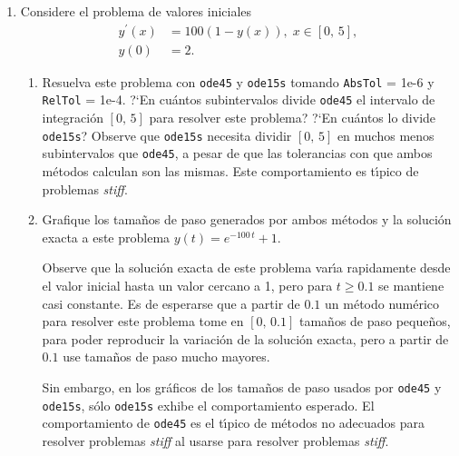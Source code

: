 \documentclass[letter,11pt]{article}
\begin{document}
\begin{enumerate}
\begin{enumerate}
\item Convierta \eqref{bubblepvi} a un sistema de ecuaciones diferenciales de primer
orden.
\item Resuelva el problema de valores iniciales resultante con $t \in [0,\,20]$
y suponiendo $A = 2.5$.
\item Grafique la aproximaci\'on resultante y observe
que es una funci\'on peri\'odica, ?`cu\'al es el per\'{\i}odo aproximado de la misma?
?`Entre qu\'e valores oscila el radio $R$ de la burbuja?
\end{enumerate}



\item Considere el problema de valores iniciales
\begin{align*}
y^{\prime}(x) &= 100(1-y(x)),\; x \in [0,\,5],\\
y(0) &= 2.
\end{align*}
\begin{enumerate}
\item Resuelva este problema con \texttt{ode45} y \texttt{ode15s}
tomando \texttt{AbsTol} = 1e-6 y \texttt{RelTol} = 1e-4.
?`En cu\'antos subintervalos divide \texttt{ode45} el intervalo de integraci\'on $[0,\,5]$
para resolver este problema?
?`En cu\'antos lo divide \texttt{ode15s}?
Observe que \texttt{ode15s} necesita dividir $[0,\,5]$ en muchos menos subintervalos
que \texttt{ode45}, a pesar de que las tolerancias con que ambos m\'etodos calculan son las mismas.
Este comportamiento es t\'{\i}pico de problemas \emph{stiff}.

\item Grafique los tama\~nos de paso generados por ambos m\'etodos y la soluci\'on
exacta a este problema $y(t) = e^{-100\,t} + 1$.

\noindent Observe que la soluci\'on exacta de este problema var\'{\i}a rapidamente desde el valor inicial
hasta un valor cercano a 1, pero para $t \ge 0.1$ se mantiene casi constante.
Es de esperarse que a partir de $0.1$ un m\'etodo num\'erico para resolver este problema tome
en $[0,\,0.1]$ tama\~nos de paso peque\~nos, para poder reproducir la variaci\'on de la soluci\'on exacta, pero
a partir de $0.1$ use tama\~nos de paso mucho mayores.

\noindent Sin embargo, en los gr\'aficos de los tama\~nos de paso usados por \texttt{ode45} y \texttt{ode15s},
s\'olo \texttt{ode15s} exhibe el comportamiento esperado. El comportamiento de \texttt{ode45} es el t\'{\i}pico
de m\'etodos no adecuados para resolver problemas \emph{stiff} al usarse para resolver problemas \emph{stiff}.
\end{enumerate}


\end{enumerate}
\end{document}
